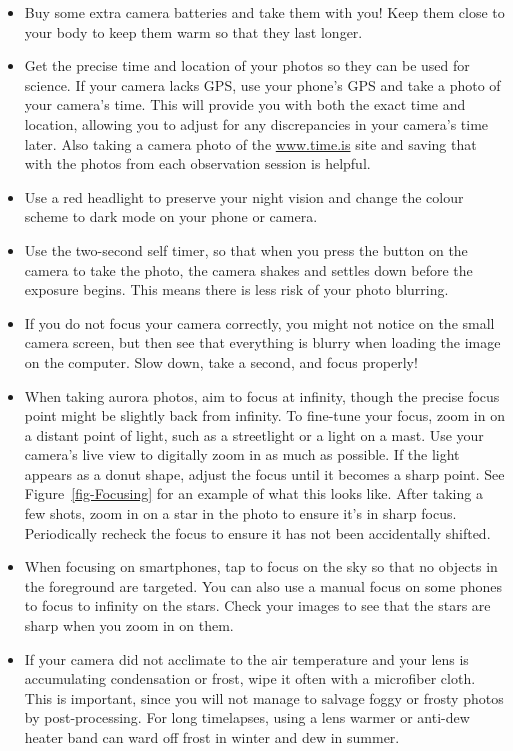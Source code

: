 \documentclass{article}
\begin{document}
\begin{itemize}
    \item Buy some extra camera batteries and take them with you! Keep them close to your body to keep them warm so that they last longer.
    \item Get the precise time and location of your photos so they can be used for science. If your camera lacks GPS, use your phone's GPS and take a photo of your camera's time. This will provide you with both the exact time and location, allowing you to adjust for any discrepancies in your camera's time later. Also taking a camera photo of the \url{www.time.is} site and saving that with the photos from each observation session is helpful.
    \item Use a red headlight to preserve your night vision and change the colour scheme to dark mode on your phone or camera.
    \item Use the two-second self timer, so that when you press the button on the camera to take the photo, the camera shakes and settles down before the exposure begins. This means there is less risk of your photo blurring.
    \item If you do not focus your camera correctly, you might not notice on the small camera screen, but then see that everything is blurry when loading the image on the computer. Slow down, take a second, and focus properly! 
    \item When taking aurora photos, aim to focus at infinity, though the precise focus point might be slightly back from infinity. To fine-tune your focus, zoom in on a distant point of light, such as a streetlight or a light on a mast. Use your camera’s live view to digitally zoom in as much as possible. If the light appears as a donut shape, adjust the focus until it becomes a sharp point. See Figure~\ref{fig-Focusing} for an example of what this looks like. After taking a few shots, zoom in on a star in the photo to ensure it’s in sharp focus. Periodically recheck the focus to ensure it has not been accidentally shifted.
    \item When focusing on smartphones, tap to focus on the sky so that no objects in the foreground are targeted. You can also use a manual focus on some phones to focus to infinity on the stars. Check your images to see that the stars are sharp when you zoom in on them.
    \item If your camera did not acclimate to the air temperature and your lens is accumulating condensation or frost, wipe it often with a microfiber cloth. This is important, since you will not manage to salvage foggy or frosty photos by post-processing. For long timelapses, using a lens warmer or anti-dew heater band can ward off frost in winter and dew in summer. 
    
\end{itemize}
\end{document}
